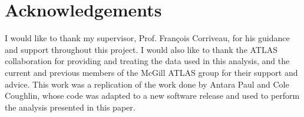 \documentclass{article}
\begin{document}
\section{Acknowledgements}
I would like to thank my supervisor, Prof. François Corriveau, for his guidance and 
support throughout this project. I would also like to thank the ATLAS collaboration 
for providing and treating the data used in this analysis, and the 
current and previous members of the McGill ATLAS group for their support and advice.
This work was a replication of the work done by Antara Paul and Cole Coughlin, 
whose code was adapted to a new software release and used to perform the
analysis presented in this paper.



  
 
\end{document}

